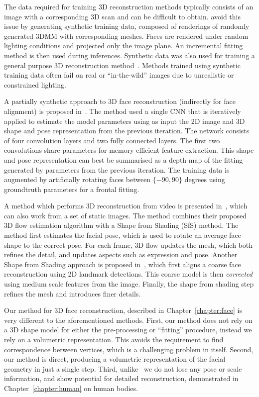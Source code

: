 The data required for training 3D reconstruction methods typically
consists of an image with a corresponding 3D scan and can be difficult
to obtain. \cite{richardson20163d} avoid this issue by generating
synthetic training data, composed of renderings of randomly generated
3DMM with corresponding meshes. Faces are rendered under random
lighting conditions and projected only the image plane. An incremental
fitting method is then used during inferences. Synthetic data was also
used for training a general purpose 3D reconstruction
method~\cite{li2015joint}. Methods trained using synthetic training
data often fail on real or ``in-the-wild'' images due to unrealistic
or constrained lighting.

A partially synthetic approach to 3D face reconstruction (indirectly
for face alignment) is proposed in~\cite{zhu2016face}. The method used
a single CNN that is iteratively applied to estimate the model
parameters using as input the 2D image and 3D shape and pose
representation from the previous iteration. The network consists of
four convolution layers and two fully connected layers. The first two
convolutions share parameters for memory efficient feature
extraction. This shape and pose representation can best be summarised
as a depth map of the fitting generated by parameters from the
previous iteration. The training data is augmented by artificially
rotating faces between $\{-90, 90\}$ degrees using groundtruth
parameters for a frontal fitting.

A method which performs 3D reconstruction from video is presented
in~\cite{suwajanakorn2014total}, which can also work from a set of
static images. The method combines their proposed 3D flow estimation
algorithm with a Shape from Shading (SfS) method. The method first
estimates the facial pose, which is used to rotate an average face
shape to the correct pose. For each frame, 3D flow updates the mesh,
which both refines the detail, and updates aspects such as expression
and pose. Another Shape from Shading approach is proposed
in~\cite{jiang20183d}, which first aligns a coarse face reconstruction
using 2D landmark detections. This coarse model is then
\textit{corrected} using medium scale features from the
image. Finally, the shape from shading step refines the mesh and
introduces finer details.

Our method for 3D face reconstruction, described in
Chapter~\ref{chapter:face} is very different to the aforementioned
methods. First, our method does not rely on a 3D shape model for
either the pre-processing or ``fitting'' procedure, instead we rely on
a volumetric representation. This avoids the requirement to find
correspondence between vertices, which is a challenging problem in
itself. Second, our method is direct, producing a volumetric
representation of the facial geometry in just a single step. Third,
unlike~\cite{tran2018extreme} we do not lose any pose or scale
information, and show potential for detailed reconstruction,
demonstrated in Chapter~\ref{chapter:human} on human bodies.



